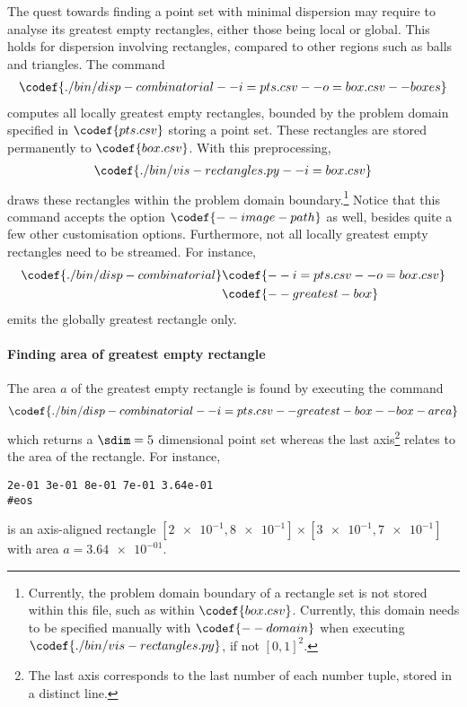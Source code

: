 The quest towards finding a point set with minimal dispersion may require to analyse its greatest empty rectangles, either those being local or global. This holds for dispersion involving rectangles, compared to other regions such as balls and triangles. The command
\begin{align*}
  \codef{./bin/disp-combinatorial --i=pts.csv --o=box.csv --boxes}
\end{align*}
computes all locally greatest empty rectangles, bounded by the problem domain specified in $\codef{pts.csv}$ storing a point set. These rectangles are stored permanently to $\codef{box.csv}$. With this preprocessing, 
\begin{align*}
  \codef{./bin/vis-rectangles.py --i=box.csv}
\end{align*}
draws these rectangles within the problem domain boundary.\footnote{Currently, the problem domain boundary of a rectangle set is not stored within this file, such as within $\codef{box.csv}$. Currently, this domain needs to be specified manually with $\codef{--domain}$ when executing $\codef{./bin/vis-rectangles.py}$, if not $[0,1]^2$.} Notice that this command accepts the option $\codef{--image-path}$ as well, besides quite a few other customisation options. Furthermore, not all locally greatest empty rectangles need to be streamed. For instance,
\begin{align*}
  \codef{./bin/disp-combinatorial }&\codef{--i=pts.csv --o=box.csv}\\
  &\codef{--greatest-box}
\end{align*}
emits the globally greatest rectangle only.

\paragraph{Finding area of greatest empty rectangle}

The area $a$ of the greatest empty rectangle is found by executing the command
\begin{align*}
  \codef{./bin/disp-combinatorial --i=pts.csv --greatest-box --box-area}
\end{align*}
which returns a $\sdim=5$ dimensional point set whereas the last axis\footnote{The last axis corresponds to the last number of each number tuple, stored in a distinct line.} relates to the area of the rectangle. For instance,
\begin{verbatim}
2e-01 3e-01 8e-01 7e-01 3.64e-01
#eos
\end{verbatim}
is an axis-aligned rectangle $[\num{2e-1},\num{8e-1}] \times [\num{3e-1},\num{7e-1}]$ with area $a=\num{3.64e-01}$.

